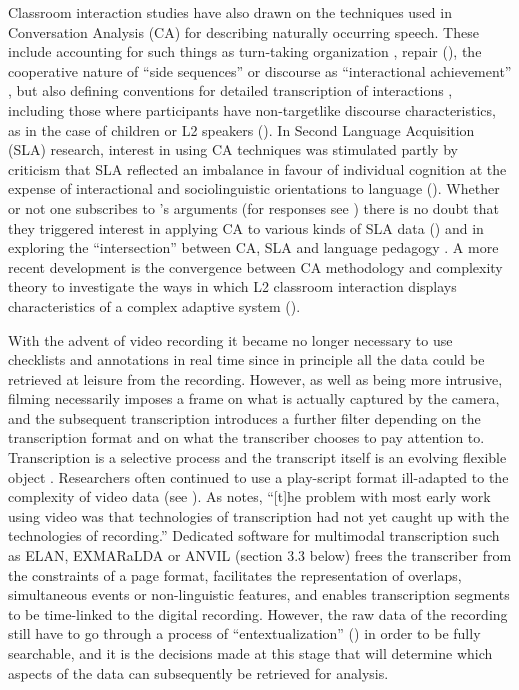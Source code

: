 \documentclass[output=paper,colorlinks,citecolor=brown,modfonts,nonflat]{../langscibook}
\begin{document}
Classroom interaction studies have also drawn on the techniques used in Conversation Analysis (CA) for describing naturally occurring speech. These include accounting for such things as turn-taking organization \citep{SacksEtAl1974}, repair (\citealt{SchegloffEtAl1977, Schegloff2000}), the cooperative nature of “side sequences” \citep{Jefferson1972} or discourse as “interactional achievement” \citep{Schegloff1982}, but also defining conventions for detailed transcription of interactions \citep{Jefferson2004}, including those where participants have non-targetlike discourse characteristics, as in the case of children \citep{Ochs1979} or L2 speakers (\citealt{Jefferson1983, Jefferson1996}). In Second Language Acquisition (SLA) research, interest in using CA techniques was stimulated partly by criticism that SLA reflected an imbalance in favour of individual cognition at the expense of interactional and sociolinguistic orientations to language (\citealt{FirthWagner1997}). Whether or not one subscribes to \citeauthor{FirthWagner1997}’s arguments (for responses see \citealt{Kasper1997,Poulisse1997,Long1997,Gass1998}) there is no doubt that they triggered interest in applying CA to various kinds of SLA data (\citealt{Markee2000,Seedhouse2004, Seedhouse2005}) and in exploring the “intersection” between CA, SLA and language pedagogy \citep{Mori2007}. A more recent development is the convergence between CA methodology and complexity theory to investigate the ways in which L2 classroom interaction displays characteristics of a complex adaptive system (\citealt{Seedhouse2010, Seedhouse2015}).

With the advent of video recording it became no longer necessary to use checklists and annotations in real time since in principle all the data could be retrieved at leisure from the recording. However, as well as being more intrusive, filming necessarily imposes a frame on what is actually captured by the camera, and the subsequent transcription introduces a further filter depending on the transcription format and on what the transcriber chooses to pay attention to. Transcription is a selective process \citep{Ochs1979} and the transcript itself is an evolving flexible object \citep{Mondada2007}. Researchers often continued to use a play-script format ill-adapted to the complexity of video data (see \citealt{Erickson2004}). As \citet[17]{Jones2013} notes, “[t]he problem with most early work using video was that technologies of transcription had not yet caught up with the technologies of recording.” Dedicated software for multimodal transcription such as ELAN, EXMARaLDA or ANVIL (section 3.3 below) frees the transcriber from the constraints of a page format, facilitates the representation of overlaps, simultaneous events or non-linguistic features, and enables transcription segments to be time-linked to the digital recording. However, the raw data of the recording still have to go through a process of “entextualization” (\citealt{BaumanBriggs1990}) in order to be fully searchable, and it is the decisions made at this stage that will determine which aspects of the data can subsequently be retrieved for analysis. 
\end{document}
